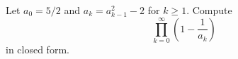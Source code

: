 Let $a_0 = 5/2$ and $a_k = a_{k-1}^2 - 2$ for $k \geq 1$. Compute
\[
\prod_{k=0}^\infty \left(1 - \frac{1}{a_k} \right)
\]
in closed form.
